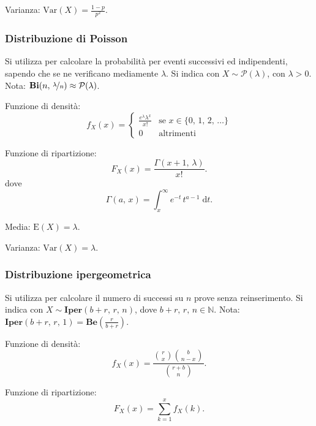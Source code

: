 \documentclass{article}
\theoremstyle{definition}
\newcommand{\N}{\mathbb{N}}
\newcommand{\E}{\text{E}}
\newcommand{\Var}{\text{Var}}
\begin{document}
                Varianza: \(\Var(X) = \frac{1-p}{p^2}\).

            \subsubsection{Distribuzione di Poisson}

                Si utilizza per calcolare la probabilità per eventi successivi ed indipendenti, sapendo che se ne
                verificano mediamente \(\lambda\). Si indica con \(X \sim \mathcal{P}(\lambda)\), con \(\lambda > 0\).
                Nota: \(\mathbf{Bi}(n, \, \nicefrac{\lambda}{n}) \approx \mathcal{P}(\lambda)\).

                Funzione di densità:
                \[
                    f_X (x) = 
                        \begin{cases}
                            \frac{e^\lambda \lambda^x}{x!} & \text{se } x \in \{0, \, 1, \, 2, \, \ldots\}\\
                            0 & \text{altrimenti}
                        \end{cases}
                \]

                Funzione di ripartizione:
                \[
                    F_X (x) = \frac{\Gamma(x + 1, \, \lambda)}{x!}.
                \]
                dove
                \[
                    \Gamma(a, \, x) = \int_x^\infty \! e^{-t} \, t^{a-1} \; \mathrm{d}t.
                \]

                Media: \(\E(X) = \lambda\).

                Varianza: \(\Var(X) = \lambda\).

            \subsubsection{Distribuzione ipergeometrica}

                Si utilizza per calcolare il numero di successi su \(n\) prove senza reinserimento. Si indica con
                \(X \sim \mathbf{Iper}(b+r, \, r, \, n)\), dove \(b+r, \, r, \, n \in \N\). Nota: \(\mathbf{Iper}(b+r, \, r, \, 1) = \mathbf{Be}\left(\frac{r}{b+r}\right)\).

                \smallskip

                Funzione di densità:
                \[
                    f_X (x) = \frac{\binom{r}{x} \binom{b}{n-x}}{\binom{r+b}{n}}.
                \]

                Funzione di ripartizione:
                \[
                    F_X (x) = \sum_{k = 1}^x f_X (k).
                \]
\end{document}
